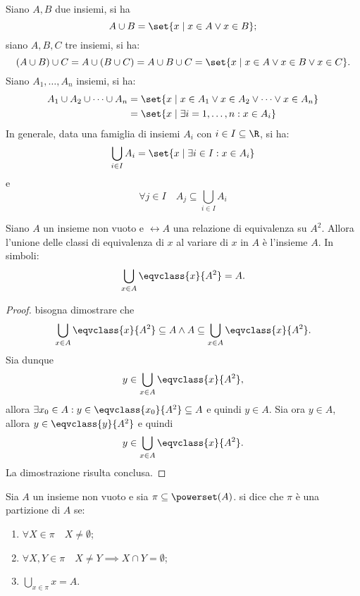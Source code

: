 \begin{remark}
    Siano \(A,B\) due insiemi, si ha
    \[
        A \cup B = \set{x \mid x \in A \lor x \in B};
    \]
    siano \(A,B,C\) tre insiemi, si ha:
    \[
        \left(A \cup B\right) \cup C = A \cup \left(B \cup C\right)
                                     = A \cup B \cup C
                                     = \set{x \mid x \in A \lor x \in B \lor x \in C}.
    \]
    Siano \(A_1, \dotsc, A_n\) insiemi, si ha:
    \begin{alignat*}{1}
        A_1 \cup A_2 \cup \cdots \cup A_n &= \set{x \mid x \in A_1 \lor x \in A_2 \lor \cdots \lor x \in A_n}\\
                                          &= \set{x \mid \exists i = 1, \dotsc, n : x \in A_i}
    \end{alignat*}
    In generale, data una famiglia di insiemi \(A_i\) con \(i \in I \subseteq \R\), si ha:
    \[
        \bigcup_{i \in I} A_i = \set{x \mid \exists i \in I : x \in A_i}
    \]
    e
    \[
        \forall j \in I \quad A_j \subseteq \bigcup_{i \in I} A_i
    \]
\end{remark}

\begin{proposition}%
    Siano \(A\) un insieme non vuoto e \(\rel{A}\) una relazione di equivalenza su \(A^2\). Allora l'unione delle classi di equivalenza di \(x\) al variare di \(x\) in \(A\) è l'insieme \(A\). In simboli:
    \[
        \bigcup_{x \in A} \eqvclass{x}{A^2} = A.
    \]
\end{proposition}

\begin{proof}
    bisogna dimostrare che
    \[
        \bigcup_{x \in A}\eqvclass{x}{A^2} \subseteq A
        \land
        A \subseteq \bigcup_{x \in A}\eqvclass{x}{A^2}.
    \]
    Sia dunque
    \[
        y \in \bigcup_{x \in A}\eqvclass{x}{A^2},
    \]
    allora \(\exists x_0 \in A : y \in \eqvclass{x_0}{A^2} \subseteq A\) e quindi \(y \in A\). Sia ora  \(y \in A\), allora \(y \in \eqvclass{y}{A^2}\) e quindi
    \[
        y \in \bigcup_{x \in A}\eqvclass{x}{A^2}.
    \]
    La dimostrazione risulta conclusa.
\end{proof}


\begin{definition}[partizione]\label{def:partizione}
    Sia \(A\) un insieme non vuoto e sia \(\pi \subseteq \powerset(A)\). si dice che \(\pi\) è una partizione di \(A\) se:
    \begin{enumerate}
        \item \(\forall X \in \pi \quad X \neq \emptyset\);
        \item \(\forall X,Y \in \pi \quad X \neq Y \implies X \cap Y = \emptyset\);
        \item \(\bigcup_{x \in \pi} x = A\).
    \end{enumerate}
\end{definition}


